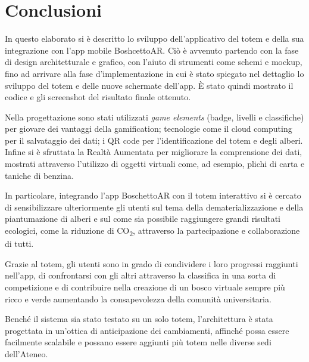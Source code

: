 \chapter{Conclusioni}
In questo elaborato si è descritto lo sviluppo dell'applicativo del totem e della sua integrazione con l'app mobile BoshcettoAR. Ciò è avvenuto partendo con la fase di design architetturale e grafico, con l'aiuto di strumenti come schemi e mockup, fino ad arrivare alla fase d'implementazione in cui è stato spiegato nel dettaglio lo sviluppo del totem e delle nuove schermate dell'app. \`E stato quindi mostrato il codice e gli screenshot del risultato finale ottenuto.

Nella progettazione sono stati utilizzati \textit{game elements} (badge, livelli e classifiche) per giovare dei vantaggi della gamification; tecnologie come il cloud computing per il salvataggio dei dati; i QR code per l'identificazione del totem e degli alberi. Infine si è sfruttata la Realtà Aumentata per migliorare la comprensione dei dati, mostrati attraverso l'utilizzo di oggetti virtuali come, ad esempio, plichi di carta e taniche di benzina.

In particolare, integrando l'app BoschettoAR con il totem interattivo si è cercato di sensibilizzare ulteriormente gli utenti sul tema della dematerializzazione e della piantumazione di alberi e sul come sia possibile raggiungere grandi risultati ecologici, come la riduzione di CO\textsubscript{2}, attraverso la partecipazione e collaborazione di tutti.

Grazie al totem, gli utenti sono in grado di condividere i loro progressi raggiunti nell'app, di confrontarsi con gli altri attraverso la classifica in una sorta di competizione e di contribuire nella creazione di un bosco virtuale sempre più ricco e verde aumentando la consapevolezza della comunità universitaria.

Benché il sistema sia stato testato su un solo totem, l’architettura è stata progettata in un’ottica di anticipazione dei cambiamenti, affinché possa essere facilmente scalabile e possano essere aggiunti più totem nelle diverse sedi dell’Ateneo.


